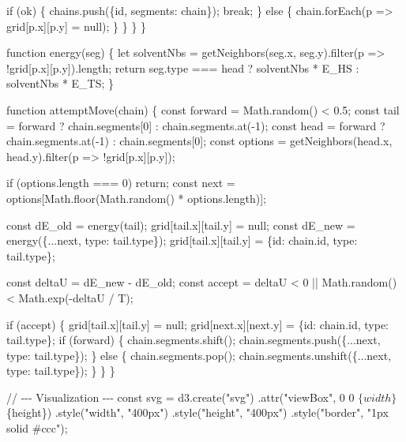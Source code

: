 \documentclass[
  letterpaper,
  enabledeprecatedfontcommands]{report}
\newenvironment{Shaded}{\begin{snugshade}}{\end{snugshade}}
\newcommand{\NormalTok}[1]{\textcolor[rgb]{0.00,0.23,0.31}{#1}}
\begin{document}
\begin{Shaded}
\begin{Highlighting}[]
\NormalTok{                if (ok) \{ chains.push(\{id, segments: chain\}); break; \}}
\NormalTok{                else \{ chain.forEach(p =\textgreater{} grid[p.x][p.y] = null); \}}
\NormalTok{            \}}
\NormalTok{        \}}
\NormalTok{    \}}

\NormalTok{    function energy(seg) \{}
\NormalTok{        let solventNbs = getNeighbors(seg.x, seg.y).filter(p =\textgreater{} !grid[p.x][p.y]).length;}
\NormalTok{        return seg.type === \textquotesingle{}head\textquotesingle{} ? solventNbs * E\_HS : solventNbs * E\_TS;}
\NormalTok{    \}}

\NormalTok{    function attemptMove(chain) \{}
\NormalTok{        const forward = Math.random() \textless{} 0.5;}
\NormalTok{        const tail = forward ? chain.segments[0] : chain.segments.at({-}1);}
\NormalTok{        const head = forward ? chain.segments.at({-}1) : chain.segments[0];}
\NormalTok{        const options = getNeighbors(head.x, head.y).filter(p =\textgreater{} !grid[p.x][p.y]);}

\NormalTok{        if (options.length === 0) return;}
\NormalTok{        const next = options[Math.floor(Math.random() * options.length)];}

\NormalTok{        const dE\_old = energy(tail);}
\NormalTok{        grid[tail.x][tail.y] = null;}
\NormalTok{        const dE\_new = energy(\{...next, type: tail.type\});}
\NormalTok{        grid[tail.x][tail.y] = \{id: chain.id, type: tail.type\};}

\NormalTok{        const deltaU = dE\_new {-} dE\_old;}
\NormalTok{        const accept = deltaU \textless{} 0 || Math.random() \textless{} Math.exp({-}deltaU / T);}

\NormalTok{        if (accept) \{}
\NormalTok{            grid[tail.x][tail.y] = null;}
\NormalTok{            grid[next.x][next.y] = \{id: chain.id, type: tail.type\};}
\NormalTok{            if (forward) \{}
\NormalTok{                chain.segments.shift();}
\NormalTok{                chain.segments.push(\{...next, type: tail.type\});}
\NormalTok{            \} else \{}
\NormalTok{                chain.segments.pop();}
\NormalTok{                chain.segments.unshift(\{...next, type: tail.type\});}
\NormalTok{            \}}
\NormalTok{        \}}
\NormalTok{    \}}

\NormalTok{    // {-}{-}{-} Visualization {-}{-}{-}}
\NormalTok{    const svg = d3.create("svg")}
\NormalTok{        .attr("viewBox", \textasciigrave{}0 0 $\{width\} $\{height\}\textasciigrave{})}
\NormalTok{        .style("width", "400px")}
\NormalTok{        .style("height", "400px")}
\NormalTok{        .style("border", "1px solid \#ccc");}


\end{Highlighting}
\end{Shaded}
\end{document}

